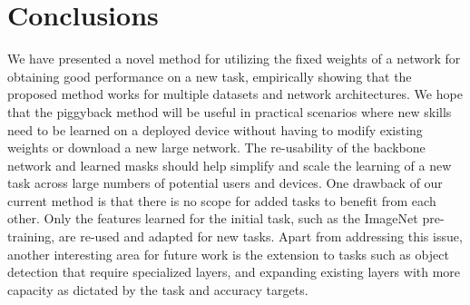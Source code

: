 \documentclass{llncs}
\begin{document}
\section{Conclusions}
\label{sec:conclusions}
We have presented a novel method for utilizing the fixed weights of a network for obtaining good performance on a new task, empirically showing that the proposed method works for multiple datasets and network architectures.
We hope that the piggyback method will be useful in  practical scenarios where new skills need to be learned on a deployed device without having to modify existing weights or download a new large network. The re-usability of the backbone network and learned masks should help simplify and scale the learning of a new task across large numbers of potential users and devices.
One drawback of our current method is that there is no scope for added tasks to benefit from each other. Only the features learned for the initial task, such as the ImageNet pre-training, are re-used and adapted for new tasks.
Apart from addressing this issue, another interesting area for future work is the extension to tasks such as object detection that require specialized layers, and expanding existing layers with more capacity as dictated by the task and accuracy targets.
%
 



\end{document}
